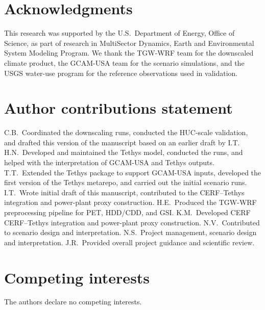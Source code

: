 \documentclass[fleqn,10pt]{wlscirep}
\begin{document}
\section*{Acknowledgments}

This research was supported by the U.S.~Department of Energy, Office of Science, as part of research in MultiSector Dynamics, Earth and Environmental System Modeling Program. We thank the TGW-WRF team for the downscaled climate product, the GCAM-USA team for the scenario simulations, and the USGS water-use program for the reference observations used in validation.

\section*{Author contributions statement}

C.B.~Coordinated the downscaling runs, conducted the HUC-scale validation, and drafted this version of the manuscript based on an earlier draft by I.T.
H.N.~Developed and maintained the Tethys model, conducted the runs, and helped with the interpretation of GCAM-USA and Tethys outputs.
T.T.~Extended the Tethys package to support GCAM-USA inputs, developed the first version of the Tethys metarepo, and carried out the initial scenario runs.
I.T.~Wrote initial draft of this manuscript, contributed to the CERF--Tethys integration and power-plant proxy construction.
H.E.~Produced the TGW-WRF preprocessing pipeline for PET, HDD/CDD, and GSI.
K.M.~Developed CERF CERF--Tethys integration and power-plant proxy construction.
N.V.~Contributed to scenario design and interpretation.
N.S.~Project management, scenario design and interpretation.
J.R.~Provided overall project guidance and scientific review.

\section*{Competing interests}

The authors declare no competing interests.


\end{document}
